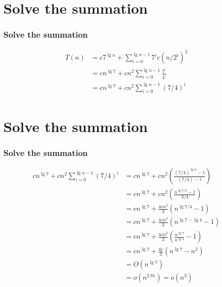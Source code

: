 \documentclass{beamer}
\newcommand{\sect}[1]{
\section{#1}
\begin{frame}[fragile]\frametitle{#1}
}
\begin{document}
\sect{Solve the summation}
\begin{align*}
  T(n) &=  c7^{\lg n} + \sum_{i=0}^{\lg n -1}7^ic(n/2^{i})^2\\
  &=   cn^{\lg 7} + cn^2\sum_{i=0}^{\lg n -1}\frac{7^i}{4^i}\\
  &=   cn^{\lg 7} + cn^2\sum_{i=0}^{\lg n -1}(7/4)^i\\
\end{align*}
\end{frame}

\sect{Solve the summation}
\begin{align*}
    cn^{\lg 7} + cn^2\sum_{i=0}^{\lg n -1}(7/4)^i
  &=   cn^{\lg 7} + cn^2\left(\frac{(7/4)^{\lg n} - 1}{(7/4)-1}\right)\\
  &=   cn^{\lg 7} + cn^2\left(\frac{n^{\lg 7/4} - 1}{3/4}\right)\\
  &=   cn^{\lg 7} + \frac{4cn^2}{3}\left(n^{\lg 7/4} - 1\right)\\
  &=   cn^{\lg 7} + \frac{4cn^2}{3}\left(n^{\lg 7-\lg 4} - 1\right)\\
  &=   cn^{\lg 7} + \frac{4cn^2}{3}\left(\frac{n^{\lg 7}}{n^{\lg 4}} - 1\right)\\
  &=   cn^{\lg 7} + \frac{4c}{3}\left(n^{\lg 7} - n^2\right)\\
  &= O(n^{\lg 7})\\
  &= o(n^{2.81}) = o(n^3)
  \end{align*}

\end{frame}
\end{document}
